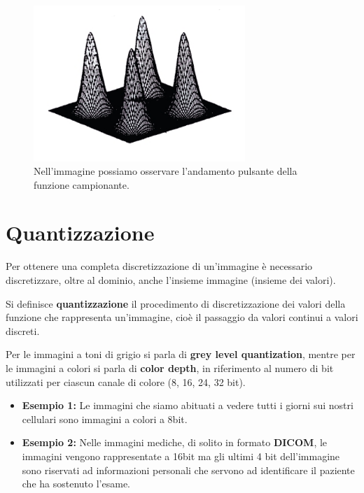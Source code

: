 \begin{figure}[H]
    \centering
    \includegraphics[width=8cm, keepaspectratio]{capitoli/immagini/imgs/puzzante.png}
    \caption{Nell'immagine possiamo osservare l'andamento pulsante della funzione campionante.}
\end{figure}

\section{Quantizzazione}
Per ottenere una completa discretizzazione di un'immagine è necessario
discretizzare, oltre al dominio, anche l'insieme immagine (insieme dei valori).
\begin{definition}
    Si definisce \textbf{quantizzazione} il procedimento di discretizzazione dei
    valori della funzione che rappresenta un'immagine, cioè il passaggio da
    valori continui a valori discreti.
\end{definition}
Per le immagini a toni di grigio si parla di \textbf{grey level quantization},
mentre per le immagini a colori si parla di \textbf{color depth}, in riferimento
al numero di bit utilizzati per ciascun canale di colore (8, 16, 24, 32 bit).
\begin{itemize}
    \item \textbf{Esempio 1:} Le immagini che siamo abituati a vedere tutti i
          giorni sui nostri cellulari sono immagini a colori a 8bit.
    \item \textbf{Esempio 2:} Nelle immagini mediche, di solito in formato
          \textbf{DICOM}, le immagini vengono rappresentate a 16bit ma gli
          ultimi 4 bit dell'immagine sono riservati ad informazioni personali
          che servono ad identificare il paziente che ha sostenuto l'esame.
\end{itemize}
